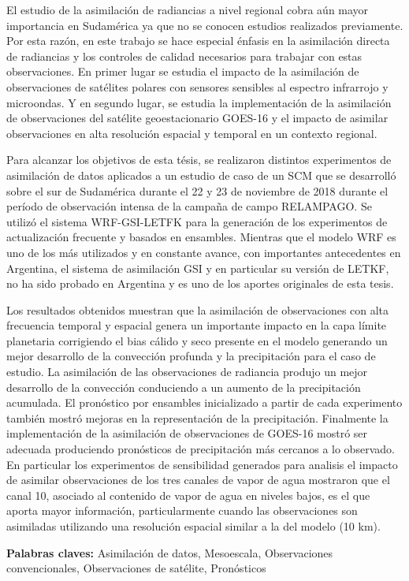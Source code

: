 \documentclass[12pt,oneside,a4paper]{reedthesis}
\begin{document}
\begin{resumen}
    El estudio de la asimilación de radiancias a nivel regional cobra aún mayor importancia en Sudamérica ya que no se conocen estudios realizados previamente. Por esta razón, en este trabajo se hace especial énfasis en la asimilación directa de radiancias y los controles de calidad necesarios para trabajar con estas observaciones. En primer lugar se estudia el impacto de la asimilación de observaciones de satélites polares con sensores sensibles al espectro infrarrojo y microondas. Y en segundo lugar, se estudia la implementación de la asimilación de observaciones del satélite geoestacionario GOES-16 y el impacto de asimilar observaciones en alta resolución espacial y temporal en un contexto regional.
    
    Para alcanzar los objetivos de esta tésis, se realizaron distintos experimentos de asimilación de datos aplicados a un estudio de caso de un SCM que se desarrolló sobre el sur de Sudamérica durante el 22 y 23 de noviembre de 2018 durante el período de observación intensa de la campaña de campo RELAMPAGO. Se utilizó el sistema WRF-GSI-LETFK para la generación de los experimentos de actualización frecuente y basados en ensambles. Mientras que el modelo WRF es uno de los más utilizados y en constante avance, con importantes antecedentes en Argentina, el sistema de asimilación GSI y en particular su versión de LETKF, no ha sido probado en Argentina y es uno de los aportes originales de esta tesis.
    
    Los resultados obtenidos muestran que la asimilación de observaciones con alta frecuencia temporal y espacial genera un importante impacto en la capa límite planetaria corrigiendo el bias cálido y seco presente en el modelo generando un mejor desarrollo de la convección profunda y la precipitación para el caso de estudio. La asimilación de las observaciones de radiancia produjo un mejor desarrollo de la convección conduciendo a un aumento de la precipitación acumulada. El pronóstico por ensambles inicializado a partir de cada experimento también mostró mejoras en la representación de la precipitación. Finalmente la implementación de la asimilación de observaciones de GOES-16 mostró ser adecuada produciendo pronósticos de precipitación más cercanos a lo observado. En particular los experimentos de sensibilidad generados para analisis el impacto de asimilar observaciones de los tres canales de vapor de agua mostraron que el canal 10, asociado al contenido de vapor de agua en niveles bajos, es el que aporta mayor información, particularmente cuando las observaciones son asimiladas utilizando una resolución espacial similar a la del modelo (10 km).
    
    \textbf{Palabras claves:} Asimilación de datos, Mesoescala, Observaciones convencionales, Observaciones de satélite, Pronósticos
  \end{resumen}
\end{document}
